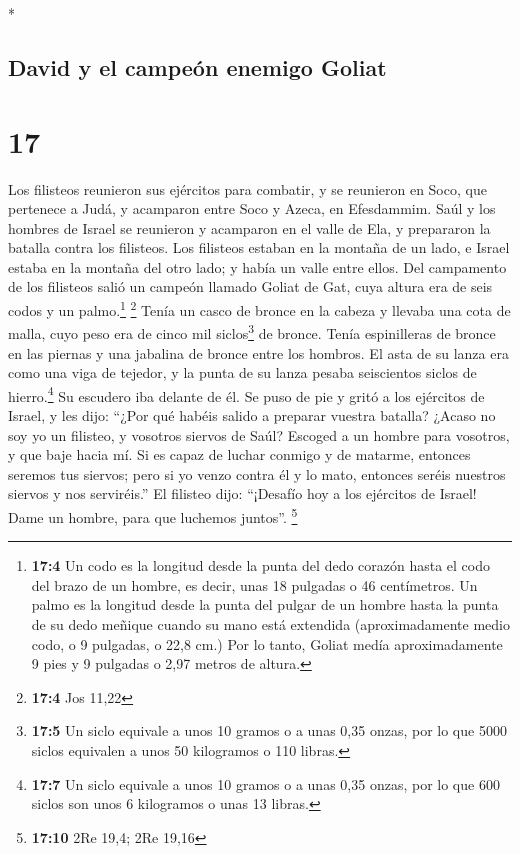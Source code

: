 \begin{paracol}{2}
\begin{otherlanguage}{english}
\end{otherlanguage}

\switchcolumn[0]*

\hypertarget{david-y-el-campeuxf3n-enemigo-goliat}{%
\subsection{David y el campeón enemigo
Goliat}\label{david-y-el-campeuxf3n-enemigo-goliat}}

\hypertarget{section-32}{%
\section{17}\label{section-32}}

 Los filisteos reunieron sus ejércitos para combatir, y se
reunieron en Soco, que pertenece a Judá, y acamparon entre Soco y Azeca,
en Efesdammim.  Saúl y los hombres de Israel se reunieron
y acamparon en el valle de Ela, y prepararon la batalla contra los
filisteos.  Los filisteos estaban en la montaña de un
lado, e Israel estaba en la montaña del otro lado; y había un valle
entre ellos.  Del campamento de los filisteos salió un
campeón llamado Goliat de Gat, cuya altura era de seis codos y un
palmo.\footnote{\textbf{17:4} Un codo es la longitud desde la punta del
  dedo corazón hasta el codo del brazo de un hombre, es decir, unas 18
  pulgadas o 46 centímetros. Un palmo es la longitud desde la punta del
  pulgar de un hombre hasta la punta de su dedo meñique cuando su mano
  está extendida (aproximadamente medio codo, o 9 pulgadas, o 22,8 cm.)
  Por lo tanto, Goliat medía aproximadamente 9 pies y 9 pulgadas o 2,97
  metros de altura.} \footnote{\textbf{17:4} Jos 11,22} 
Tenía un casco de bronce en la cabeza y llevaba una cota de malla, cuyo
peso era de cinco mil siclos\footnote{\textbf{17:5} Un siclo equivale a
  unos 10 gramos o a unas 0,35 onzas, por lo que 5000 siclos equivalen a
  unos 50 kilogramos o 110 libras.} de bronce.  Tenía
espinilleras de bronce en las piernas y una jabalina de bronce entre los
hombros.  El asta de su lanza era como una viga de
tejedor, y la punta de su lanza pesaba seiscientos siclos de
hierro.\footnote{\textbf{17:7} Un siclo equivale a unos 10 gramos o a
  unas 0,35 onzas, por lo que 600 siclos son unos 6 kilogramos o unas 13
  libras.} Su escudero iba delante de él.  Se puso de pie
y gritó a los ejércitos de Israel, y les dijo: ``¿Por qué habéis salido
a preparar vuestra batalla? ¿Acaso no soy yo un filisteo, y vosotros
siervos de Saúl? Escoged a un hombre para vosotros, y que baje hacia mí.
 Si es capaz de luchar conmigo y de matarme, entonces
seremos tus siervos; pero si yo venzo contra él y lo mato, entonces
seréis nuestros siervos y nos serviréis.''  El filisteo
dijo: ``¡Desafío hoy a los ejércitos de Israel! Dame un hombre, para que
luchemos juntos''. \footnote{\textbf{17:10} 2Re 19,4; 2Re 19,16}


\end{paracol}
